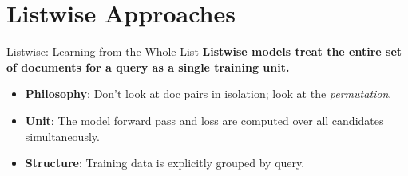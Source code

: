 \documentclass[aspectratio=169]{beamer}
\newif\ifanimated
\newcommand{\cpause}{\ifanimated\pause\fi}
\begin{document}
\section{Listwise Approaches}

\begin{frame}[plain]
\sectionpage
\end{frame}

\begin{frame}{Listwise: Learning from the Whole List}
\textbf{Listwise models treat the entire set of documents for a query as a single training unit.}

\vspace{0.8em}
\begin{itemize}
    \item \textbf{Philosophy}: Don't look at doc pairs in isolation; look at the \textit{permutation}.
    \item \textbf{Unit}: The model forward pass and loss are computed over all candidates simultaneously.
    \item \textbf{Structure}: Training data is explicitly grouped by query.
\end{itemize}\cpause

\vspace{0.5em}
\begin{center}

\end{center}
\end{frame}
\end{document}

